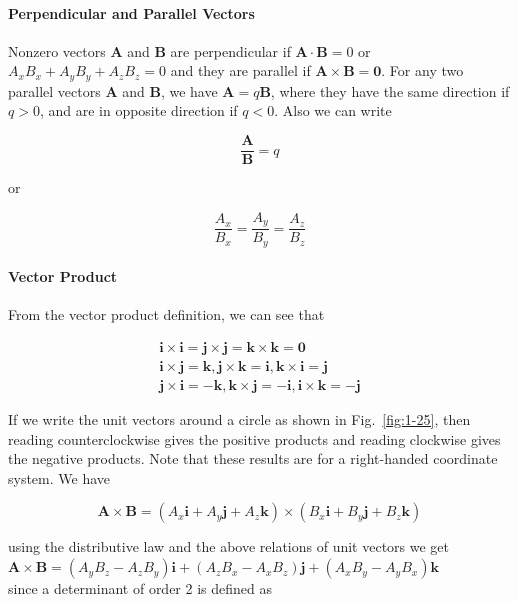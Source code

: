 \documentclass[10pt]{article}
\numberwithin{equation}{section}
\begin{document}
\paragraph{Perpendicular and Parallel Vectors}\label{sec:1-8-2-5}
Nonzero vectors $\mathbf{A}$ and $\mathbf{B}$ are perpendicular if $\mathbf{A} \cdot \mathbf{B}=0$ or $A_{x} B_{x}+A_{y} B_{y}+A_{z} B_{z}=0$ and they are parallel if $\mathbf{A} \times \mathbf{B}=\mathbf{0}$. For any two parallel vectors $\mathbf{A}$ and $\mathbf{B}$, we have $\mathbf{A}=q \mathbf{B}$, where they have the same direction if $q>0$, and are in opposite direction if $q<0$. Also we can write

$$
\frac{\mathbf{A}}{\mathbf{B}}=q
$$

or

$$
\frac{A_{x}}{B_{x}}=\frac{A_{y}}{B_{y}}=\frac{A_{z}}{B_{z}}
$$

\paragraph{Vector Product}\label{sec:1-8-2-6}
From the vector product definition, we can see that

$$
\begin{gathered}
\mathbf{i} \times \mathbf{i}=\mathbf{j} \times \mathbf{j}=\mathbf{k} \times \mathbf{k}=\mathbf{0} \\
\mathbf{i} \times \mathbf{j}=\mathbf{k}, \mathbf{j} \times \mathbf{k}=\mathbf{i}, \mathbf{k} \times \mathbf{i}=\mathbf{j} \\
\mathbf{j} \times \mathbf{i}=-\mathbf{k}, \mathbf{k} \times \mathbf{j}=-\mathbf{i}, \mathbf{i} \times \mathbf{k}=-\mathbf{j}
\end{gathered}
$$

If we write the unit vectors around a circle as shown in Fig.~\ref{fig:1-25}, then reading counterclockwise gives the positive products and reading clockwise gives the negative products. Note that these results are for a right-handed coordinate system. We have

$$
\mathbf{A} \times \mathbf{B}=\left(A_{x} \mathbf{i}+A_{y} \mathbf{j}+A_{z} \mathbf{k}\right) \times\left(B_{x} \mathbf{i}+B_{y} \mathbf{j}+B_{z} \mathbf{k}\right)
$$

using the distributive law and the above relations of unit vectors we get\\
$\mathbf{A} \times \mathbf{B}=\left(A_{y} B_{z}-A_{z} B_{y}\right) \mathbf{i}+\left(A_{z} B_{x}-A_{x} B_{z}\right) \mathbf{j}+\left(A_{x} B_{y}-A_{y} B_{x}\right) \mathbf{k}$\\
since a determinant of order 2 is defined as
\end{document}
